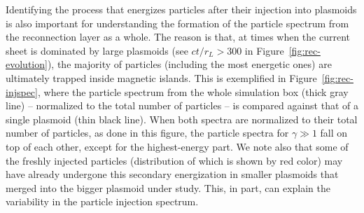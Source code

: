 Identifying the process that energizes particles after their injection into plasmoids is also important for understanding the formation of the particle spectrum from the reconnection layer as a whole. The reason is that, at times when the current sheet is dominated by large plasmoids (see $ct/r_L > 300$ in Figure~\ref{fig:rec-evolution}), the majority of particles (including the most energetic ones) are ultimately trapped inside magnetic islands. This is exemplified in Figure~\ref{fig:rec-injspec}, where the particle spectrum from the whole simulation box (thick gray line) -- normalized to the total number of particles -- is compared against that of a single plasmoid (thin black line). When both spectra are normalized to their total number of particles, as done in this figure, the particle spectra for $\gamma \gg 1$ fall on top of each other, except for the highest-energy part. We note also that some of the freshly injected particles (distribution of which is shown by red color) may have already undergone this secondary energization in smaller plasmoids that merged into the bigger plasmoid under study. This, in part, can explain the variability in the particle injection spectrum.

